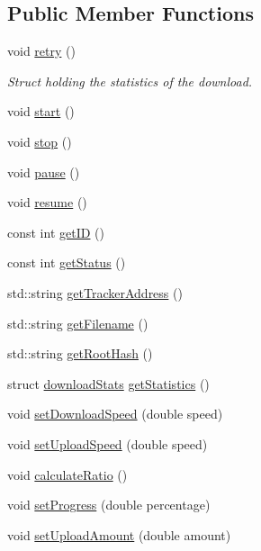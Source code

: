 \subsection*{Public Member Functions}
\begin{DoxyCompactItemize}
\item 
void \hyperlink{classDownload_a99a1589ee0906a366165c66c19847731}{retry} ()
\begin{DoxyCompactList}\small\item\em Struct holding the statistics of the download. \end{DoxyCompactList}\item 
void \hyperlink{classDownload_a0bc88cfbfadb55895ddebc82de870fcb}{start} ()
\item 
void \hyperlink{classDownload_aeca037d7cdb6c9eea45d6b6af73c0178}{stop} ()
\item 
void \hyperlink{classDownload_a5aa20de69b9efadb5e53cd7a1b3958fb}{pause} ()
\item 
void \hyperlink{classDownload_a4a69b04a8a04d4f8189b8bc2c6dee089}{resume} ()
\item 
const int \hyperlink{classDownload_a95546aa8f4cda5d6ffac2953554574a0}{getID} ()
\item 
const int \hyperlink{classDownload_a56547b8fc462711844c8c9563cd37f17}{getStatus} ()
\item 
std::string \hyperlink{classDownload_a604525e2d21ace401b8b431530f29fe4}{getTrackerAddress} ()
\item 
std::string \hyperlink{classDownload_a46a8a8f77f0ffdb4d08b4c54c16c0ba1}{getFilename} ()
\item 
std::string \hyperlink{classDownload_a4820d9e567818192a45acd8da30a1c51}{getRootHash} ()
\item 
struct \hyperlink{structDownload_1_1downloadStats}{downloadStats} \hyperlink{classDownload_a4e8dd13e8db63c4af6e447eb6197a69c}{getStatistics} ()
\item 
void \hyperlink{classDownload_aa948713f8d655f6acb9eee77d7ffc738}{setDownloadSpeed} (double speed)
\item 
void \hyperlink{classDownload_a24f4c58a1bcfca51e0266a7641fd8675}{setUploadSpeed} (double speed)
\item 
void \hyperlink{classDownload_ab17441df2532bf2b31072917cd718c6e}{calculateRatio} ()
\item 
void \hyperlink{classDownload_a582a90c7b16dda1f10e28820fca1d0ec}{setProgress} (double percentage)
\item 
void \hyperlink{classDownload_aed65f7b7ed3f376a523276ef730533a0}{setUploadAmount} (double amount)

\end{DoxyCompactItemize}
